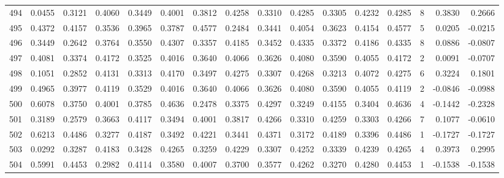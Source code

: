 \begin{tabular}{lrrrrrrrrrrrrrrr}
494 &      0.0455 &  0.3121 &  0.4060 &  0.3449 &  0.4001 &  0.3812 &  0.4258 &  0.3310 &  0.4285 &  0.3305 &   0.4232 &     0.4285 &      8 &                    0.3830 &                     0.2666 \\
495 &      0.4372 &  0.4157 &  0.3536 &  0.3965 &  0.3787 &  0.4577 &  0.2484 &  0.3441 &  0.4054 &  0.3623 &   0.4154 &     0.4577 &      5 &                    0.0205 &                    -0.0215 \\
496 &      0.3449 &  0.2642 &  0.3764 &  0.3550 &  0.4307 &  0.3357 &  0.4185 &  0.3452 &  0.4335 &  0.3372 &   0.4186 &     0.4335 &      8 &                    0.0886 &                    -0.0807 \\
497 &      0.4081 &  0.3374 &  0.4172 &  0.3525 &  0.4016 &  0.3640 &  0.4066 &  0.3626 &  0.4080 &  0.3590 &   0.4055 &     0.4172 &      2 &                    0.0091 &                    -0.0707 \\
498 &      0.1051 &  0.2852 &  0.4131 &  0.3313 &  0.4170 &  0.3497 &  0.4275 &  0.3307 &  0.4268 &  0.3213 &   0.4072 &     0.4275 &      6 &                    0.3224 &                     0.1801 \\
499 &      0.4965 &  0.3977 &  0.4119 &  0.3529 &  0.4016 &  0.3640 &  0.4066 &  0.3626 &  0.4080 &  0.3590 &   0.4055 &     0.4119 &      2 &                   -0.0846 &                    -0.0988 \\
500 &      0.6078 &  0.3750 &  0.4001 &  0.3785 &  0.4636 &  0.2478 &  0.3375 &  0.4297 &  0.3249 &  0.4155 &   0.3404 &     0.4636 &      4 &                   -0.1442 &                    -0.2328 \\
501 &      0.3189 &  0.2579 &  0.3663 &  0.4117 &  0.3494 &  0.4001 &  0.3817 &  0.4266 &  0.3310 &  0.4259 &   0.3303 &     0.4266 &      7 &                    0.1077 &                    -0.0610 \\
502 &      0.6213 &  0.4486 &  0.3277 &  0.4187 &  0.3492 &  0.4221 &  0.3441 &  0.4371 &  0.3172 &  0.4189 &   0.3396 &     0.4486 &      1 &                   -0.1727 &                    -0.1727 \\
503 &      0.0292 &  0.3287 &  0.4183 &  0.3428 &  0.4265 &  0.3259 &  0.4229 &  0.3307 &  0.4252 &  0.3339 &   0.4239 &     0.4265 &      4 &                    0.3973 &                     0.2995 \\
504 &      0.5991 &  0.4453 &  0.2982 &  0.4114 &  0.3580 &  0.4007 &  0.3700 &  0.3577 &  0.4262 &  0.3270 &   0.4280 &     0.4453 &      1 &                   -0.1538 &                    -0.1538 \\

\end{tabular}
